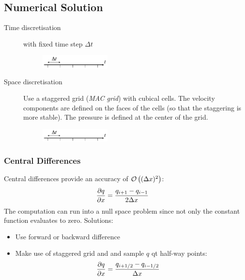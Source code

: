 \begin{multicols}{2}
\subsection{Numerical Solution}
\begin{description}
	\item[Time discretisation] with fixed time step $\Delta t$
		\begin{figure}[H]
			\centering
			\includegraphics[page=1,width=0.35\textwidth]{img/05_discretisation}
		\end{figure}
	\item[Space discretisation] Use a staggered grid (\emph{MAC grid}) with cubical cells. The velocity components are defined on the faces of the cells (so that the staggering is more stable). The pressure is defined at the center of the grid.
		\begin{figure}[H]
			\centering
			\includegraphics[page=2,width=0.35\textwidth]{img/05_discretisation}
		\end{figure}
\end{description}

\subsubsection{Central Differences}
Central differences provide an accuracy of $\mathcal O\left((\Delta x)^2\right)$:
\begin{align*}
	{\partial q \over \partial x} &= {q_{i+1} - q_{i-1} \over 2 \Delta x}
\end{align*}
The computation can run into a null space problem since not only the constant function evaluates to zero.
Solutions:
\begin{itemize}
	\item Use forward or backward difference
	\item Make use of staggered grid and and sample $q$ qt half-way points:
		\begin{align*}
			{\partial q \over \partial x} &= {q_{i+1/2} - q_{i-1/2} \over \Delta x}
		\end{align*}


\end{itemize}
\end{multicols}
